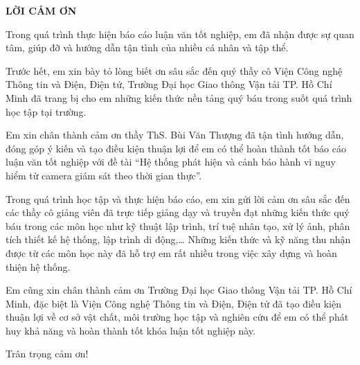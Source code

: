 
\begin{center}
\textbf{\MakeUppercase{LỜI CẢM ƠN}}
\end{center}


Trong quá trình thực hiện báo cáo luận văn tốt nghiệp, em đã nhận được sự quan tâm, giúp đỡ và hướng dẫn tận tình của nhiều cá nhân và tập thể.

Trước hết, em xin bày tỏ lòng biết ơn sâu sắc đến quý thầy cô Viện Công nghệ Thông tin và Điện, Điện tử, Trường Đại học Giao thông Vận tải TP. Hồ Chí Minh đã trang bị cho em những kiến thức nền tảng quý báu trong suốt quá trình học tập tại trường.

Em xin chân thành cảm ơn thầy ThS. Bùi Văn Thượng đã tận tình hướng dẫn, đóng góp ý kiến và tạo điều kiện thuận lợi để em có thể hoàn thành tốt báo cáo luận văn tốt nghiệp với đề tài “Hệ thống phát hiện và cảnh báo hành vi nguy hiểm từ camera giám sát theo thời gian thực”.

Trong quá trình học tập và thực hiện báo cáo, em xin gửi lời cảm ơn sâu sắc đến các thầy cô giảng viên đã trực tiếp giảng dạy và truyền đạt những kiến thức quý báu trong các môn học như kỹ thuật lập trình, trí tuệ nhân tạo, xử lý ảnh, phân tích thiết kế hệ thống, lập trình di động,… Những kiến thức và kỹ năng thu nhận được từ các môn học này đã hỗ trợ em rất nhiều trong việc xây dựng và hoàn thiện hệ thống.

Em cũng xin chân thành cảm ơn Trường Đại học Giao thông Vận tải TP. Hồ Chí Minh, đặc biệt là Viện Công nghệ Thông tin và Điện, Điện tử đã tạo điều kiện thuận lợi về cơ sở vật chất, môi trường học tập và nghiên cứu để em có thể phát huy khả năng và hoàn thành tốt khóa luận tốt nghiệp này.

Trân trọng cảm ơn!

\clearpage

